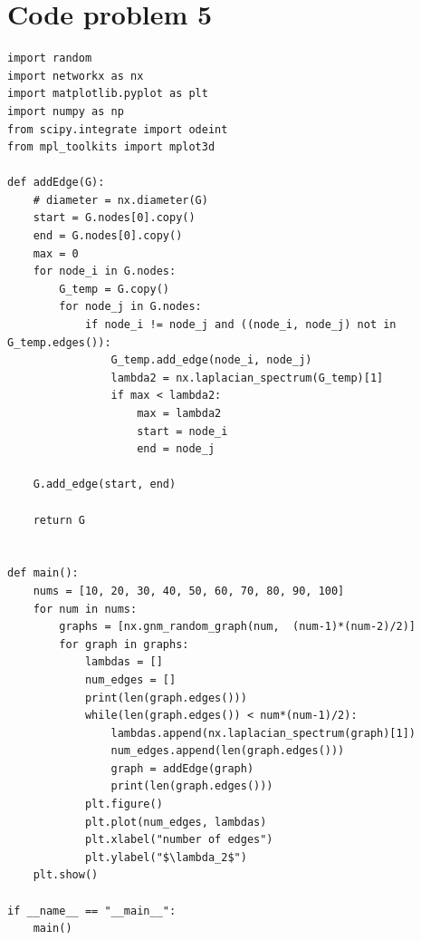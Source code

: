 \documentclass{article}
\begin{document}
\section*{Code problem 5}
\begin{verbatim}
import random
import networkx as nx
import matplotlib.pyplot as plt
import numpy as np
from scipy.integrate import odeint
from mpl_toolkits import mplot3d

def addEdge(G):
    # diameter = nx.diameter(G)
    start = G.nodes[0].copy()
    end = G.nodes[0].copy()
    max = 0    
    for node_i in G.nodes:
        G_temp = G.copy()
        for node_j in G.nodes:
            if node_i != node_j and ((node_i, node_j) not in G_temp.edges()):
                G_temp.add_edge(node_i, node_j)
                lambda2 = nx.laplacian_spectrum(G_temp)[1]
                if max < lambda2:
                    max = lambda2
                    start = node_i
                    end = node_j
    
    G.add_edge(start, end)
                
    return G


def main():
    nums = [10, 20, 30, 40, 50, 60, 70, 80, 90, 100]
    for num in nums:
        graphs = [nx.gnm_random_graph(num,  (num-1)*(num-2)/2)]
        for graph in graphs:
            lambdas = []
            num_edges = []
            print(len(graph.edges()))
            while(len(graph.edges()) < num*(num-1)/2):
                lambdas.append(nx.laplacian_spectrum(graph)[1])
                num_edges.append(len(graph.edges()))
                graph = addEdge(graph)
                print(len(graph.edges()))
            plt.figure()
            plt.plot(num_edges, lambdas)
            plt.xlabel("number of edges")
            plt.ylabel("$\lambda_2$")
    plt.show()

if __name__ == "__main__":
    main()
\end{verbatim}
\end{document}
